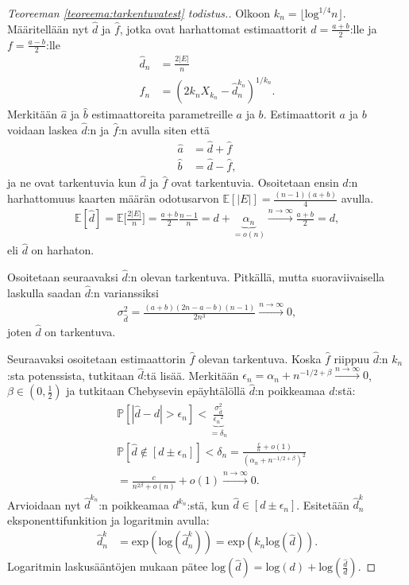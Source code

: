 \documentclass[finnish,12pt,a4paper,pdftex,sci,utf8]{aaltothesis}
\newcommand\floor[1]{\lfloor#1\rfloor}
\begin{document}
\begin{proof}[Teoreeman \ref{teoreema:tarkentuvatest} todistus.]
	Olkoon $k_n = \floor{\text{log}^{1/4}n}$. Määritellään nyt $\hat{d}$ ja $\hat{f}$, jotka ovat harhattomat estimaattorit $d = \frac{a+b}{2}$:lle ja $f = \frac{a-b}{2}$:lle
	\begin{align*}
		\hat{d}_{n} &= \frac{2\left|E\right|}{n} \\
		\hat{f}_n &= (2 k_n X_{k_{n}} - \hat{d}_{n}^{k_n})^{1/k_n}.
	\end{align*}
Merkitään $\hat{a}$ ja $\hat{b}$ estimaattoreita parametreille $a$ ja $b$. Estimaattorit $a$ ja $b$ voidaan laskea $\hat{d}$:n ja $\hat{f}$:n avulla siten että
	\begin{align*}
		\hat{a} &= \hat{d} + \hat{f} \\
		\hat{b} &= \hat{d} - \hat{f},
	\end{align*}
        ja ne ovat tarkentuvia kun $\hat{d}$ ja  $\hat{f}$ ovat tarkentuvia.
	Osoitetaan ensin $\hat{d}$:n harhattomuus kaarten määrän odotusarvon $\mathbb{E}[|E|] = \frac{(n-1)(a+b)}{4}$ avulla.
	\begin{align*}
		\mathbb{E}[\hat{d}] = \mathbb{E}\bigg[ \frac{2|E|}{n} \bigg] = \frac{a+b}{2}\frac{n-1}{n} = d + \underbrace{\alpha_n}_{= o(n)} \xrightarrow{n \rightarrow \infty}\frac{a+b}{2} = d,
	\end{align*}
	eli $\hat{d}$ on harhaton.

	Osoitetaan seuraavaksi $\hat{d}$:n olevan tarkentuva. Pitkällä, mutta suoraviivaisella laskulla saadan $\hat{d}$:n varianssiksi
	\begin{align*}
		\sigma_{\hat{d}}^2 = \frac{(a+b)(2n-a-b)(n-1)}{2n^3} \xrightarrow{n \rightarrow \infty} 0,
	\end{align*}
	joten $\hat{d}$ on tarkentuva.

	Seuraavaksi osoitetaan estimaattorin $\hat{f}$ olevan tarkentuva. Koska $\hat{f}$ riippuu $\hat{d}$:n $k_n$:sta potenssista, tutkitaan $\hat{d}$:tä lisää. Merkitään $\epsilon_{n}^{} = \alpha_n + n^{-1/2 + \beta} \xrightarrow{n \rightarrow \infty} 0 $, $\beta \in (0,\frac{1}{2})$ ja tutkitaan Chebysevin epäyhtälöllä $\hat{d}$:n poikkeamaa $d$:stä:
	\begin{align*}
		&\mathbb{P}[|\hat{d} - d| > \epsilon_{n}^{}] < \underbrace{\frac{\sigma_{\hat{d}}^2}{{\epsilon_{n}^{}}^2}}_{ = \delta_n} \\
		&\mathbb{P}[\hat{d} \notin [d \pm  \epsilon_{n}^{}]] < \delta_n = \frac{\frac{c}{n} + o(1)}{(\alpha_n + n^{-1/2 + \beta})^2} \\
		&= \frac{c}{{n^{2 \beta}} +  o(n)} + o(1) \xrightarrow{n \rightarrow \infty} 0.
	\end{align*}
	Arvioidaan nyt $\hat{d}^{k_n}$:n poikkeamaa $d^{k_n}$:stä, kun $\hat{d} \in [d \pm \epsilon_{n}^{}]$.
	Esitetään $\hat{d}^k_n$ eksponenttifunkition ja logaritmin avulla:
	\begin{align*}
		\hat{d}^k_n &= \text{exp}(\text{log}(\hat{d}^k_n)) = \text{exp}(k_n \text{log}(\hat{d})).
	\end{align*}
	Logaritmin laskusääntöjen mukaan pätee $\text{log}(\hat{d}) = \text{log}(d) + \text{log}(\frac{\hat{d}}{d})$.


\end{proof}
\end{document}
